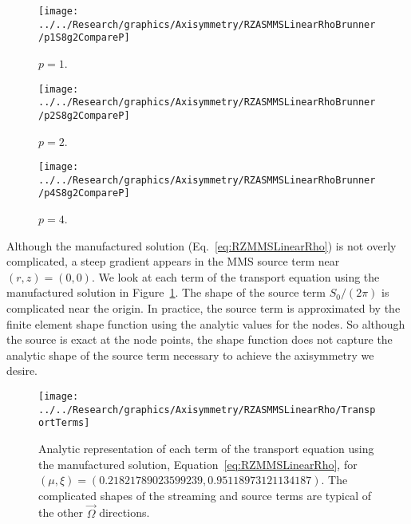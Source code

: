 \documentclass[12pt]{article}
\begin{document}
\begin{sidewaysfigure}[!htb]
\centering
\begin{subfigure}{0.33\textwidth}
\texttt{[image: ../../Research/graphics/Axisymmetry/RZASMMSLinearRhoBrunner/p1S8g2CompareP]}
\caption{$p=1$.}
\end{subfigure}%
\begin{subfigure}{0.33\textwidth}
\texttt{[image: ../../Research/graphics/Axisymmetry/RZASMMSLinearRhoBrunner/p2S8g2CompareP]}
\caption{$p=2$.}
\end{subfigure}%
\begin{subfigure}{0.33\textwidth}
\texttt{[image: ../../Research/graphics/Axisymmetry/RZASMMSLinearRhoBrunner/p4S8g2CompareP]}
\caption{$p=4$.}
\end{subfigure}
\caption{Relative asymmetry for $p=\{1,2,4\}$ finite elements on a $2^\text{nd}$-order mesh for $S_8$ level-symmetric angular quadrature.}
\label{fig:RZASMMSLinearRhoBrunnerg2CompareP}
\end{sidewaysfigure}

Although the manufactured solution (Eq.~\ref{eq:RZMMSLinearRho}) is not overly complicated, a steep gradient appears in the MMS source term near $(r,z)=(0,0)$. We look at each term of the transport equation using the manufactured solution in Figure~\ref{fig:RZMMSLinearRhoAnalytic}. The shape of the source term $S_0/(2 \pi)$ is complicated near the origin. In practice, the source term is approximated by the finite element shape function using the analytic values for the nodes. So although the source is exact at the node points, the shape function does not capture the analytic shape of the source term necessary to achieve the axisymmetry we desire.

\begin{figure}
\texttt{[image: ../../Research/graphics/Axisymmetry/RZASMMSLinearRho/TransportTerms]}
\caption{Analytic representation of each term of the transport equation using the manufactured solution, Equation~\ref{eq:RZMMSLinearRho}, for $(\mu,\xi)=(0.21821789023599239,0.95118973121134187)$. The complicated shapes of the streaming and source terms are typical of the other $\vec{\Omega}$ directions.}
\label{fig:RZMMSLinearRhoAnalytic}
\end{figure}
\end{document}
